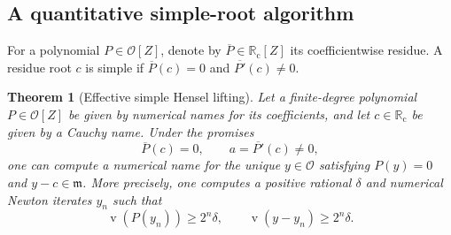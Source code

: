 \documentclass[11pt,letterpaper]{article}
\numberwithin{equation}{section}
\newtheorem{theorem}{Theorem}[section]
\theoremstyle{definition}
\theoremstyle{remark}
\newcommand{\Rc}{\mathbb R_{\mathrm c}}
\newcommand{\val}{\operatorname{v}}
\newcommand{\Oh}{\mathcal O}
\newcommand{\mh}{\mathfrak m}
\begin{document}
\subsection{A quantitative simple-root algorithm}

For a polynomial $P\in\Oh[Z]$, denote by $\overline P\in\Rc[Z]$ its
coefficientwise residue. A residue root $c$ is simple if
$\overline P(c)=0$ and $\overline{P'}(c)\ne0$.

\begin{theorem}[Effective simple Hensel lifting]
\label{thm:hensel}
Let a finite-degree polynomial $P\in\Oh[Z]$ be given by numerical names for
its coefficients, and let $c\in\Rc$ be given by a Cauchy name. Under the
promises
\[
 \overline P(c)=0,\qquad a=\overline{P'}(c)\ne0,
\]
one can compute a numerical name for the unique $y\in\Oh$ satisfying
$P(y)=0$ and $y-c\in\mh$.
More precisely, one computes a positive rational $\delta$ and numerical
Newton iterates $y_n$ such that
\begin{equation}\label{eq:newtonbounds}
 \val(P(y_n))\ge2^n\delta,\qquad
 \val(y-y_n)\ge2^n\delta.
\end{equation}
\end{theorem}
\end{document}

